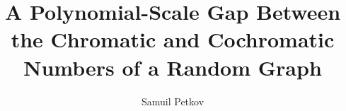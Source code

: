 \documentclass[11pt,reqno]{amsart}
\title[Chromatic and cochromatic numbers]{A Polynomial-Scale Gap Between the
Chromatic and Cochromatic Numbers of a Random Graph}
\author[Samuil Petkov]{Samuil Petkov}
\begin{document}





\renewcommand{\bibsection}{\section*{References}}


\end{document}
